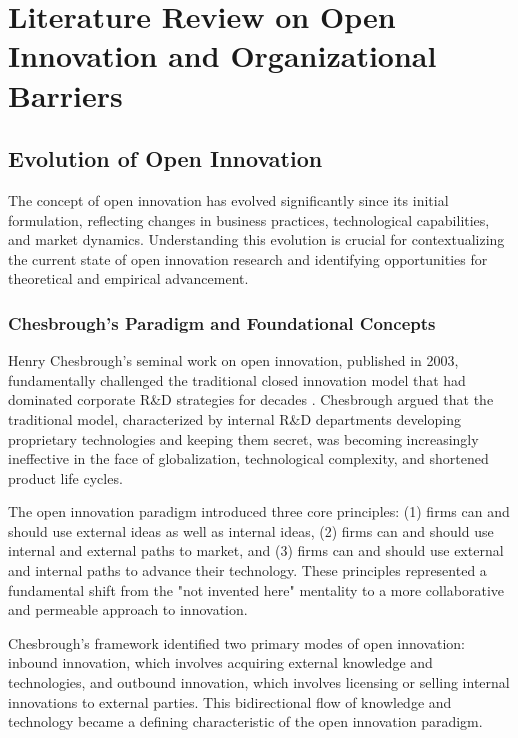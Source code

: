 \documentclass[12pt,a4paper]{article}
\begin{document}
\chapter{Literature Review on Open Innovation and Organizational Barriers}

\section{Evolution of Open Innovation}

The concept of open innovation has evolved significantly since its initial formulation, reflecting changes in business practices, technological capabilities, and market dynamics. Understanding this evolution is crucial for contextualizing the current state of open innovation research and identifying opportunities for theoretical and empirical advancement.

\subsection{Chesbrough's Paradigm and Foundational Concepts}

Henry Chesbrough's seminal work on open innovation, published in 2003, fundamentally challenged the traditional closed innovation model that had dominated corporate R\&D strategies for decades \cite{chesbrough2003open}. Chesbrough argued that the traditional model, characterized by internal R\&D departments developing proprietary technologies and keeping them secret, was becoming increasingly ineffective in the face of globalization, technological complexity, and shortened product life cycles.

The open innovation paradigm introduced three core principles: (1) firms can and should use external ideas as well as internal ideas, (2) firms can and should use internal and external paths to market, and (3) firms can and should use external and internal paths to advance their technology. These principles represented a fundamental shift from the "not invented here" mentality to a more collaborative and permeable approach to innovation.

Chesbrough's framework identified two primary modes of open innovation: inbound innovation, which involves acquiring external knowledge and technologies, and outbound innovation, which involves licensing or selling internal innovations to external parties. This bidirectional flow of knowledge and technology became a defining characteristic of the open innovation paradigm.
\end{document}
